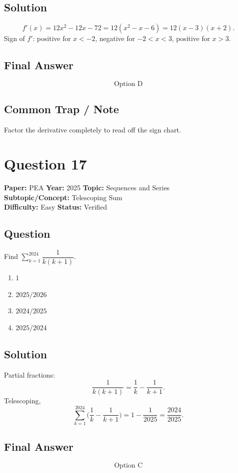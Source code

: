 \documentclass[11pt]{article}
\begin{document}
\subsection*{Solution}
\[
f'(x) = 12 x^2 - 12 x - 72 = 12(x^2 - x - 6) = 12(x-3)(x+2).
\]
Sign of $f'$: positive for $x<-2$, negative for $-2<x<3$, positive for $x>3$.

\subsection*{Final Answer}
\[
\boxed{\text{Option D}}
\]

\subsection*{Common Trap / Note}
Factor the derivative completely to read off the sign chart.

\section*{Question 17}
\textbf{Paper:} PEA \quad \textbf{Year:} 2025 \quad \textbf{Topic:} Sequences and Series \\
\textbf{Subtopic/Concept:} Telescoping Sum \\
\textbf{Difficulty:} Easy \quad \textbf{Status:} Verified

\subsection*{Question}
Find $\sum_{k=1}^{2024}\dfrac{1}{k(k+1)}$.
\begin{enumerate}[label=(\Alph*)]
\item $1$ \item $2025/2026$ \item $2024/2025$ \item $2025/2024$
\end{enumerate}

\subsection*{Solution}
Partial fractions:
\[
\frac{1}{k(k+1)} = \frac{1}{k} - \frac{1}{k+1}.
\]
Telescoping,
\[
\sum_{k=1}^{2024}\Big(\frac{1}{k} - \frac{1}{k+1}\Big) = 1 - \frac{1}{2025} = \frac{2024}{2025}.
\]

\subsection*{Final Answer}
\[
\boxed{\text{Option C}}
\]
\end{document}
